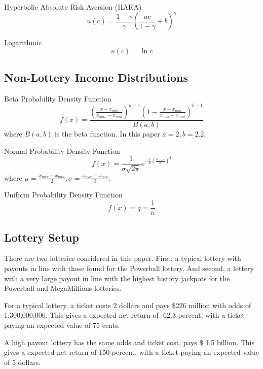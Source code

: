 \documentclass[letterpaper,12pt]{article}
\numberwithin{equation}{section}
\numberwithin{figure}{section}
\numberwithin{table}{section}
\begin{document}
\begin{spacing}{1.5}
		Hyperbolic Absolute Risk Aversion (HARA)
		\begin{equation}
			u(c) = \frac{1-\gamma}{\gamma} \left( \frac{a c}{1-\gamma} + b \right)^\gamma
		\end{equation}

		Logarithmic
		\begin{equation}
			u(c) = \ln c
		\end{equation}

	\subsection{Non-Lottery Income Distributions} \label{sec_dist}

		Beta Probability Density Function
		\begin{equation}
			f(x) = \frac{\left( \frac{x-x_{min}}{x_{max}-x_{min}} \right)^{a-1} \left(1 - \frac{x-x_{min}}{x_{max}-x_{min}} \right )^{b-1}} {B(a,b)}
		\end{equation}
		where $B(a,b)$ is the beta function.  In this paper $a=2, b=2.2$.

		Normal Probability Density Function
		\begin{equation}
			f(x) = \frac{1}{\sigma \sqrt{2 \pi}} e^{-\frac{1}{2} \left(\frac{x-\mu}{\sigma} \right)^2}
		\end{equation}
		where $\mu = \frac{x_{max}+x_{min}}{2}, \sigma = \frac{x_{max}-x_{min}}{3}$.

		Uniform Probability Density Function
		\begin{equation}
			f(x) = q = \frac{1}{n}
		\end{equation}	

	\subsection{Lottery Setup} \label{sec_lottery}

		There are two lotteries considered in this paper.  First, a typical lottery with payouts in line with those found for the Powerball lottery.  And second, a lottery with a very large payout in line with the highest history jackpots for the Powerball and MegaMillions lotteries.

		For a typical lottery, a ticket costs 2 dollars and pays \$226 million with odds of 1:300,000,000.  This gives a expected net return of -62.3 percent, with a ticket paying an expected value of 75 cents.

		A high payout lottery has the same odds and ticket cost, pays \$ 1.5 billion.  This gives a expected net return of 150 percent, with a ticket paying an expected value of 5 dollars.


\end{spacing}
\end{document}
